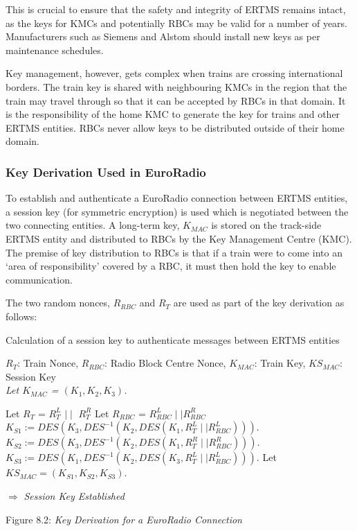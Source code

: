 \documentclass[twoside,11pt,a4paper]{article}
\begin{document}
This is crucial to ensure that the safety and integrity of ERTMS remains intact, as the keys for KMCs and potentially RBCs may be valid for a number of years. Manufacturers such as Siemens and Alstom should install new keys as per maintenance schedules.

Key management, however, gets complex when trains are crossing international borders. The train key is shared with neighbouring KMCs in the region that the train may travel through so that it can be accepted by RBCs in that domain. It is the responsibility of the home KMC to generate the key for trains and other ERTMS entities. RBCs never allow keys to be distributed outside of their home domain.

\subsubsection{Key Derivation Used in EuroRadio}
To establish and authenticate a EuroRadio connection between ERTMS entities, a session key (for symmetric encryption) is used which is negotiated between the two connecting entities. A long-term key, $K_{MAC}$ is stored on the track-side ERTMS entity and distributed to RBCs by the Key Management Centre (KMC). The premise of key distribution to RBCs is that if a train were to come into an `area of responsibility' covered by a RBC, it must then hold the key to enable communication.

The two random nonces, $R_{RBC}$ and $R_T$ are used as part of the key derivation as follows:\\
\begin{algorithm}[H]
\renewcommand{\thealgorithm}{}
\caption{Calculation of a session key to authenticate messages between ERTMS entities}
$R_T$: Train Nonce, $R_{RBC}$: Radio Block Centre Nonce, $K_{MAC}$: Train Key, $KS_{MAC}$: Session Key\\
\textit{Let $K_{MAC}$ = $(K_1,K_2,K_3)$.}

\label{Key Derivation}
\begin{algorithmic}[1]
\STATE Let $R_{T}$ = $R_T^L$ $\mid\mid$ $R_T^R$
\STATE Let $R_{RBC}$ = $R_{RBC}^L \mid\mid R_{RBC}^R$
\STATE $K_{S1} := DES(K_3, DES^{-1}(K_2, DES(K_1, R_T^L \mid\mid R_{RBC}^L))). $
\STATE $K_{S2} := DES(K_3, DES^{-1}(K_2, DES(K_1, R_T^R \mid\mid R_{RBC}^R))). $
\STATE $K_{S3} := DES(K_1, DES^{-1}(K_2, DES(K_3, R_T^L \mid\mid R_{RBC}^L))). $
\STATE Let $KS_{MAC} = (K_{S1},K_{S2},K_{S3})$.

\end{algorithmic}
$\Rightarrow$ \textit{Session Key Established}
\end{algorithm}
\begin{center}
\vspace{-0.4cm}
Figure 8.2: \textit{Key Derivation for a EuroRadio Connection}
\end{center}
\end{document}
